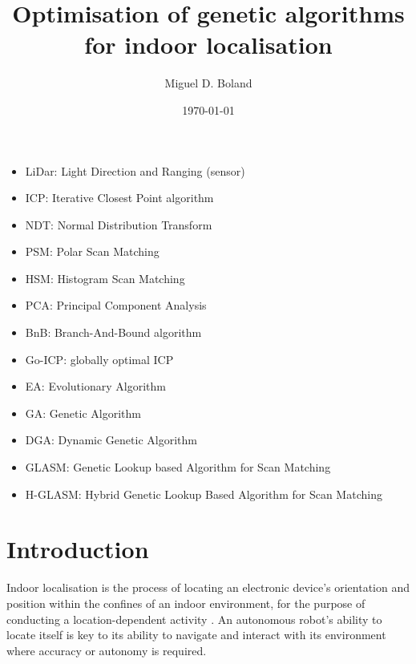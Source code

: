 \documentclass[authoryearcitations]{UoYCSproject}
\author{Miguel D. Boland}
\title{Optimisation of genetic algorithms for indoor localisation}
\date{\today}
\begin{document}
\maketitle
\listoffigures
\listoftables
\lstlistoflistings
\begin{itemize}
	\item LiDar: Light Direction and Ranging (sensor)
	\item ICP: Iterative Closest Point algorithm \cite{Besl1992-pd}
	\item NDT: Normal Distribution Transform
	\item PSM: Polar Scan Matching
	\item HSM: Histogram Scan Matching
	\item PCA: Principal Component Analysis
	\item BnB: Branch-And-Bound algorithm \cite{Land1960-yw}
	\item Go-ICP: globally optimal ICP \cite{Yang2013-gx}
	\item EA: Evolutionary Algorithm
	\item GA: Genetic Algorithm
	\item DGA: Dynamic Genetic Algorithm \cite{Chow2004-xc}
	\item GLASM: Genetic Lookup based Algorithm for Scan Matching \cite{Lenac2007-xm}
	\item H-GLASM: Hybrid Genetic Lookup Based Algorithm for Scan Matching \cite{Lenac2011-co}

\end{itemize}



\chapter{Introduction}
\label{cha:Introduction}
Indoor localisation is the process of locating an electronic device's orientation and position within the confines of an indoor environment, for the purpose of conducting a location-dependent activity \cite{Curran2011-zs}. An autonomous robot's ability to locate itself is key to its ability to navigate and interact with its environment where accuracy or autonomy is required.
\newline
\end{document}
